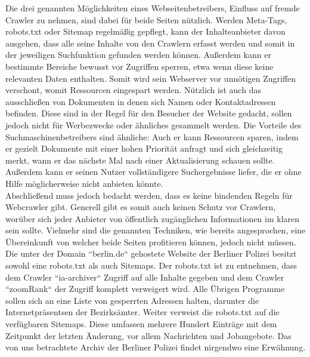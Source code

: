 Die drei genannten Möglichkeiten eines Webseitenbetreibers, Einfluss auf fremde Crawler zu nehmen, sind dabei für beide Seiten nützlich. Werden Meta-Tags, robots.txt oder Sitemap regelmäßig gepflegt, kann der Inhalteanbieter davon ausgehen, dass alle seine Inhalte von den Crawlern erfasst werden und somit in der jeweiligen Suchfunktion gefunden werden können. Außerdem kann er bestimmte Bereiche bewusst vor Zugriffen sperren, etwa wenn diese keine relevanten Daten enthalten. Somit wird sein Webserver vor unnötigen Zugriffen verschont, womit Ressourcen eingespart werden. Nützlich ist auch das ausschließen von Dokumenten in denen sich Namen oder Kontaktadressen befinden. Diese sind in der Regel für den Besucher der Website gedacht, sollen jedoch nicht für Werbezwecke oder ähnliches gesammelt werden. Die Vorteile des Suchmaschinenbetreibers sind ähnliche: Auch er kann Ressourcen sparen, indem er gezielt Dokumente mit einer hohen Priorität anfragt und sich gleichzeitig merkt, wann er das nächste Mal nach einer Aktualisierung schauen sollte. Außerdem kann er seinen Nutzer vollständigere Suchergebnisse liefer, die er ohne Hilfe möglicherweise nicht anbieten könnte.\\
Abschließend muss jedoch bedacht werden, dass es keine bindenden Regeln für Webcrawler gibt. Generell gibt es somit auch keinen Schutz vor Crawlern, worüber sich jeder Anbieter von öffentlich zugänglichen Informationen im klaren sein sollte. Vielmehr sind die genannten Techniken, wie bereits angesprochen, eine Übereinkunft von welcher beide Seiten profitieren können, jedoch nicht müssen.\\
Die unter der Domain ``berlin.de`` gehostete Website der Berliner Polizei besitzt sowohl eine robots.txt als auch Sitemaps. Der robots.txt ist zu entnehmen, dass dem Crawler ``ia-archiver`` Zugriff auf alle Inhalte gegeben und dem Crawler ``zoomRank`` der Zugriff komplett verweigert wird. Alle Übrigen Programme sollen sich an eine Liste von gesperrten Adressen halten, darunter die Internetpräsentsen der Bezirksämter. Weiter verweist die robots.txt auf die verfügbaren Sitemaps. Diese umfassen mehrere Hundert Einträge mit dem Zeitpunkt der letzten Änderung, vor allem Nachrichten und Jobangebote. Das von uns betrachtete Archiv der Berliner Polizei findet nirgendwo eine Erwähnung. \cite{berlinrobots} \cite{berlinsitemap}

